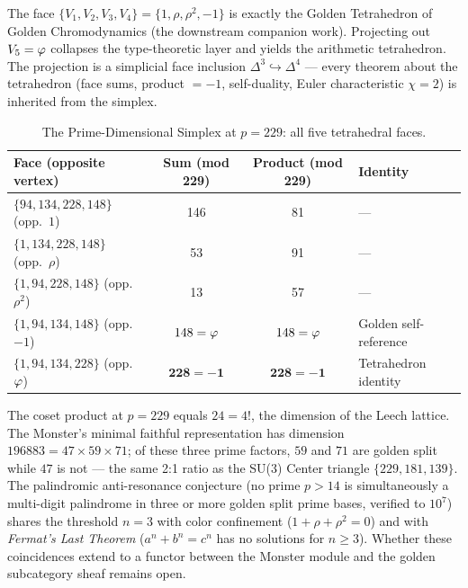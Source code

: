 \begin{corollary}\label{cor:projection}
The face $\{V_1, V_2, V_3, V_4\} = \{1, \rho, \rho^2, -1\}$ is exactly the Golden Tetrahedron of Golden Chromodynamics (the downstream companion work). Projecting out $V_5 = \varphi$ collapses the type-theoretic layer and yields the arithmetic tetrahedron. The projection is a simplicial face inclusion $\Delta^3 \hookrightarrow \Delta^4$ --- every theorem about the tetrahedron (face sums, product $= -1$, self-duality, Euler characteristic $\chi = 2$) is inherited from the simplex.
\end{corollary}

\begin{table}[!ht]
\centering\small
\caption{The Prime-Dimensional Simplex at $p = 229$: all five tetrahedral faces.}
\begin{tabular}{@{}lccl@{}}
\toprule
\textbf{Face (opposite vertex)} & \textbf{Sum (mod 229)} & \textbf{Product (mod 229)} & \textbf{Identity} \\
\midrule
$\{94, 134, 228, 148\}$ (opp.\ $1$) & 146 & 81 & --- \\
$\{1, 134, 228, 148\}$ (opp.\ $\rho$) & 53 & 91 & --- \\
$\{1, 94, 228, 148\}$ (opp.\ $\rho^2$) & 13 & 57 & --- \\
$\{1, 94, 134, 148\}$ (opp.\ $-1$) & $148 = \varphi$ & $148 = \varphi$ & Golden self-reference \\
$\{1, 94, 134, 228\}$ (opp.\ $\varphi$) & $\mathbf{228 = -1}$ & $\mathbf{228 = -1}$ & Tetrahedron identity \\
\bottomrule
\end{tabular}
\end{table}

\begin{remark}\label{rem:24-nexus}
The coset product at $p = 229$ equals $24 = 4!$, the dimension of the Leech lattice. The Monster's minimal faithful representation has dimension $196883 = 47 \times 59 \times 71$; of these three prime factors, $59$ and $71$ are golden split while $47$ is not --- the same 2:1 ratio as the SU(3) Center triangle $\{229, 181, 139\}$. The palindromic anti-resonance conjecture\label{conj:antires} (no prime $p > 14$ is simultaneously a multi-digit palindrome in three or more golden split prime bases, verified to $10^7$) shares the threshold $n = 3$ with color confinement ($1 + \rho + \rho^2 = 0$) and with \emph{Fermat's Last Theorem} ($a^n + b^n = c^n$ has no solutions for $n \geq 3$). Whether these coincidences extend to a functor between the Monster module and the golden subcategory sheaf remains open.
\end{remark}

